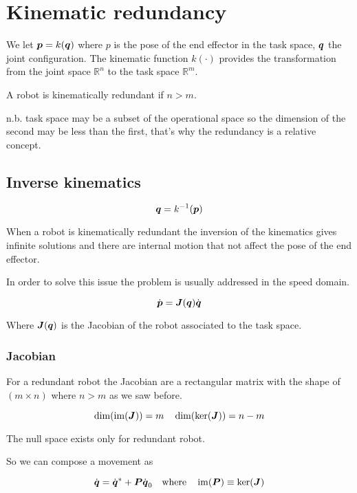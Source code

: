 \chapter{Kinematic redundancy}

We let $\boldsymbol{p}=k(\boldsymbol{q})$ where $p$ is the pose of the end effector in the task space, $\boldsymbol{q}$ the joint configuration. The kinematic function $k(\cdot)$ provides the transformation from the joint space $\mathbb{R}^n$ to the task space $\mathbb{R}^m$.

A robot is kinematically redundant if $n > m$.

\begin{em} n.b. task space may be a subset of the operational space so the dimension of the second may be less than the first, that's why the redundancy is a relative concept.\end{em}

\section{Inverse kinematics}

$$ \boldsymbol{q}=k^{-1}(\boldsymbol{p})$$

When a robot is kinematically redundant the inversion of the kinematics gives infinite solutions and there are internal motion that not affect the pose of the end effector.

In order to solve this issue the problem is usually addressed in the speed domain.

\begin{equation}
\dot{\boldsymbol{p}} = \boldsymbol{J}(\boldsymbol{q}) \dot{\boldsymbol{q}}
\label{eqn:inverse-constraint}
\end{equation}

Where $\boldsymbol{J}(\boldsymbol{q})$ is the Jacobian of the robot associated to the task space.

\subsection{Jacobian}

For a redundant robot the Jacobian are a rectangular matrix with the shape of $(m \times n)$ where $n > m$ as we saw before.

$$ \dim(\operatorname{im}(\boldsymbol{J})) = m \quad \dim(\ker(\boldsymbol{J})) = n - m $$

The null space exists only for redundant robot.

So we can compose a movement as

$$ \dot{\boldsymbol{q}} = \dot{\boldsymbol{q}}^* + \boldsymbol{P} \dot{\boldsymbol{q}}_0 \quad \text{where} \quad \operatorname{im}(\boldsymbol{P}) \equiv \ker(\boldsymbol{J}) $$

